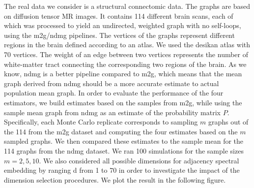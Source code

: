 \documentclass[simplex.tex]{subfiles}
\begin{document}
The real data we consider is a structural connectomic data.
The graphs are based on diffusion tensor MR
images. It contains 114 different brain scans, each of
which was processed to yield an undirected, weighted graph with no
self-loops, using the m2g/ndmg pipelines.  The vertices of the graphs
represent different regions in the brain defined according to an atlas.
We used the  desikan atlas with 70 vertices. The weight of an edge
between two vertices represents the number of white-matter tract
connecting the corresponding two regions of the brain.
As we know, ndmg is a better pipeline compared to m2g, which means that the mean graph derived from ndmg should be a more accurate estimate to actual population mean graph.
In order to evaluate the performance of the four estimators, we build estimates based on the samples from m2g, while using the sample mean graph from ndmg as an estimate of the probability matrix $P$.
Specifically, each Monte Carlo replicate corresponds to sampling $m$ graphs out
of the 114 from the m2g dataset and computing the four estimates based on the $m$ sampled graphs.
We then compared these estimates to the sample mean for the 114 graphs from the ndmg dataset.
We ran 100 simulations for the sample sizes $m=2, 5, 10$.
We also considered all possible dimensions for adjacency spectral embedding by ranging d from 1 to 70 in
order to investigate the impact of the dimension selection procedures.
We plot the result in the following figure.
\end{document}
